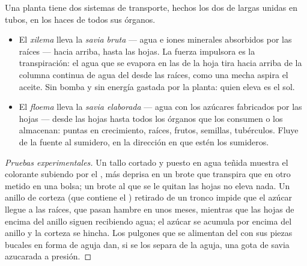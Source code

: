 \begin{proposition}\label{prop:g12:plant-rooted-life:saps}
Una planta tiene dos sistemas de transporte, hechos los dos de 
largas unidas en tubos, en los haces de todos sus órganos.
\begin{itemize}
  \item El \emph{xilema} lleva la \emph{savia bruta} ---
        agua e iones minerales absorbidos por las raíces --- hacia
        arriba, hasta las hojas. La fuerza impulsora es la
        transpiración: el agua que se evapora en las  de la
        hoja tira hacia arriba de la columna continua de agua del
         desde las raíces, como una mecha aspira el aceite. Sin
        bomba y sin energía gastada por la planta: quien eleva es el
        sol.
  \item El \emph{floema} lleva la \emph{savia elaborada}
        --- agua con los azúcares fabricados por las hojas --- desde
        las hojas hasta todos los órganos que los consumen o los
        almacenan: puntas en crecimiento, raíces, frutos, semillas,
        tubérculos. Fluye de la fuente al sumidero, en la dirección en
        que estén los sumideros.
\end{itemize}
\end{proposition}
\begin{proof}[Pruebas experimentales]
Un tallo cortado y puesto en agua teñida muestra el colorante subiendo
por el , más deprisa en un brote que transpira que en otro
metido en una bolsa; un brote al que se le quitan las hojas no eleva
nada. Un anillo de corteza (que contiene el ) retirado de un
tronco impide que el azúcar llegue a las raíces, que pasan hambre en
unos meses, mientras que las hojas de encima del anillo siguen
recibiendo agua; el azúcar se acumula por encima del anillo y la
corteza se hincha. Los pulgones que se alimentan del  con sus
piezas bucales en forma de aguja dan, si se los separa de la aguja, una
gota de savia azucarada a presión.
\end{proof}

